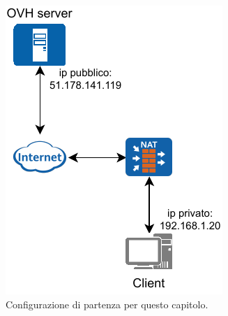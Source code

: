 \begin{figure}[H]

    \centering

    \begin{subfigure}{0.5\textwidth}
        \centering
        \includegraphics[height=1.2\linewidth]{immagini/diag-simple_ips}
        \caption{Configurazione di partenza per questo capitolo.}
        \label{fig:diag-simple_ips}
    \end{subfigure}%
    \hfill
    \begin{subfigure}{0.5\textwidth}
        \centering

\end{subfigure}
\end{figure}
